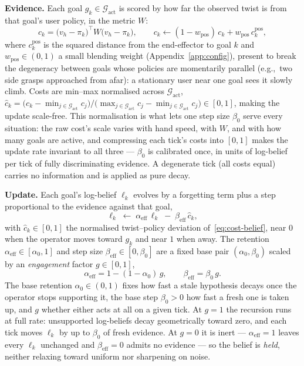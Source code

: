 \textbf{Evidence.} Each goal $g_k \in \mathcal{G}_{\text{act}}$ is scored by how far the observed twist is from that goal's user policy, in the metric $W$:
\begin{equation}
c_k = \bigl(v_h - \pi_k\bigr)^{\top} W \bigl(v_h - \pi_k\bigr),
\qquad
c_k \leftarrow (1-w_{\text{pos}})\,c_k + w_{\text{pos}}\,c_k^{\text{pos}},
\label{eq:cost-belief}
\end{equation}
where $c_k^{\text{pos}}$ is the squared distance from the end-effector to goal $k$ and $w_{\text{pos}} \in (0,1)$ a small blending weight (Appendix~\ref{app:config}), present to break the degeneracy between goals whose policies are momentarily parallel (e.g.,\ two side grasps approached from afar): a stationary user near one goal sees it slowly climb. Costs are min--max normalised across $\mathcal{G}_{\text{act}}$,
$\hat{c}_k = \bigl(c_k - \min_{j \in \mathcal{G}_{\text{act}}} c_j\bigr)\big/\bigl(\max_{j \in \mathcal{G}_{\text{act}}} c_j - \min_{j \in \mathcal{G}_{\text{act}}} c_j\bigr) \in [0,1]$, making the update scale-free. This normalisation is what lets one step size $\beta_0$ serve every situation: the raw cost's scale varies with hand speed, with $W$, and with how many goals are active, and compressing each tick's costs into $[0,1]$ makes the update rate invariant to all three --- $\beta_0$ is calibrated once, in units of log-belief per tick of fully discriminating evidence. A degenerate tick (all costs equal) carries no information and is applied as pure decay.

\textbf{Update.} Each goal's log-belief $\ell_k$ evolves by a forgetting term plus a step proportional to the evidence against that goal,
\begin{equation}
\ell_k \;\leftarrow\; \alpha_{\text{eff}}\,\ell_k \;-\; \beta_{\text{eff}}\,\hat{c}_k,
\label{eq:beliefupdate}
\end{equation}
with $\hat{c}_k \in [0,1]$ the normalised twist--policy deviation of~\eqref{eq:cost-belief}, near $0$ when the operator moves toward $g_k$ and near $1$ when away. The retention $\alpha_{\text{eff}} \in [\alpha_0, 1]$ and step size $\beta_{\text{eff}} \in [0, \beta_0]$ are a fixed base pair $(\alpha_0, \beta_0)$ scaled by an \emph{engagement} factor $g \in [0,1]$,
\begin{equation}
\alpha_{\text{eff}} = 1 - (1 - \alpha_0)\,g,
\qquad
\beta_{\text{eff}} = \beta_0\, g.
\label{eq:effgains}
\end{equation}
The base retention $\alpha_0 \in (0,1)$ fixes how fast a stale hypothesis decays once the operator stops supporting it, the base step $\beta_0 > 0$ how fast a fresh one is taken up, and $g$ whether either acts at all on a given tick. At $g = 1$ the recursion runs at full rate: unsupported log-beliefs decay geometrically toward zero, and each tick moves $\ell_k$ by up to $\beta_0$ of fresh evidence. At $g = 0$ it is inert --- $\alpha_{\text{eff}} = 1$ leaves every $\ell_k$ unchanged and $\beta_{\text{eff}} = 0$ admits no evidence --- so the belief is \emph{held}, neither relaxing toward uniform nor sharpening on noise.

